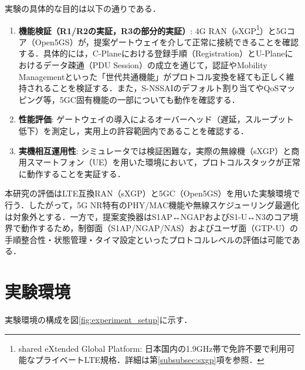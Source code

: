 実験の具体的な目的は以下の通りである．

\begin{enumerate}
    \item \textbf{機能検証（R1/R2の実証，R3の部分的実証）}: 4G RAN（sXGP\footnote{shared eXtended Global Platform: 日本国内の1.9GHz帯で免許不要で利用可能なプライベートLTE規格．詳細は第\ref{subsubsec:sxgp}項を参照．}）と5Gコア（Open5GS）が，提案ゲートウェイを介して正常に接続できることを確認する．具体的には，C-Planeにおける登録手順（Registration）とU-Planeにおけるデータ疎通（PDU Session）の成立を通じて，認証やMobility Managementといった「世代共通機能」がプロトコル変換を経ても正しく維持されることを検証する．また，S-NSSAIのデフォルト割り当てやQoSマッピング等，5GC固有機能の一部についても動作を確認する．
    \item \textbf{性能評価}: ゲートウェイの導入によるオーバーヘッド（遅延，スループット低下）を測定し，実用上の許容範囲内であることを確認する．
    \item \textbf{実機相互運用性}: シミュレータでは検証困難な，実際の無線機（sXGP）と商用スマートフォン（UE）を用いた環境において，プロトコルスタックが正常に動作することを実証する．
\end{enumerate}

本研究の評価はLTE互換RAN（sXGP）と5GC（Open5GS）を用いた実験環境で行う．したがって，5G NR特有のPHY/MAC機能や無線スケジューリング最適化は対象外とする．一方で，提案変換器はS1AP↔NGAPおよびS1-U↔N3のコア境界で動作するため，制御面（S1AP/NGAP/NAS）およびユーザ面（GTP-U）の手順整合性・状態管理・タイマ設定といったプロトコルレベルの評価は可能である．

\section{実験環境}
実験環境の構成を図\ref{fig:experiment_setup}に示す．

